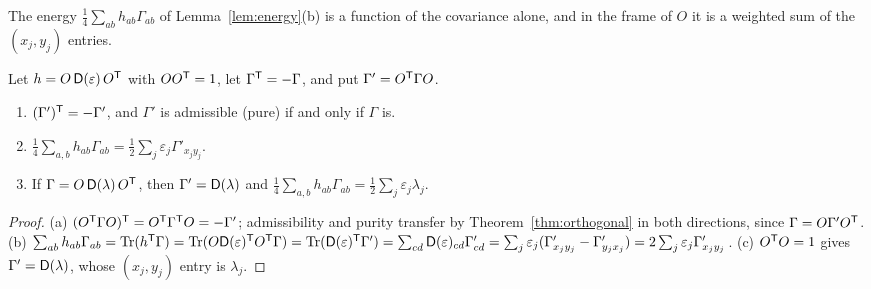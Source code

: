 The energy $\tfrac14\sum_{ab}h_{ab}\Gamma_{ab}$ of Lemma~\ref{lem:energy}(b) is a function of
the covariance alone, and in the frame of $O$ it is a weighted sum of the $(x_j,y_j)$ entries.
\begin{lemma}\label{lem:rotated-form}
Let $h=O\,\mathsf D(\varepsilon)\,O^{\mathsf T}$ with $OO^{\mathsf T}=1$, let $\Gamma^{\mathsf T}=-\Gamma$, and put
$\Gamma'=O^{\mathsf T}\Gamma O$.
\begin{enumerate}
\item[(a)] $(\Gamma')^{\mathsf T}=-\Gamma'$, and $\Gamma'$ is admissible (pure) if and only if $\Gamma$ is.
\item[(b)] $\tfrac14\sum_{a,b}h_{ab}\Gamma_{ab}=\tfrac12\sum_j\varepsilon_j\Gamma'_{x_jy_j}$.
\item[(c)] If $\Gamma=O\,\mathsf D(\lambda)\,O^{\mathsf T}$, then $\Gamma'=\mathsf D(\lambda)$ and
$\tfrac14\sum_{a,b}h_{ab}\Gamma_{ab}=\tfrac12\sum_j\varepsilon_j\lambda_j$.
\end{enumerate}
\end{lemma}
\begin{proof}
(a) $(O^{\mathsf T}\Gamma O)^{\mathsf T}=O^{\mathsf T}\Gamma^{\mathsf T}O=-\Gamma'$; admissibility and purity transfer
by Theorem~\ref{thm:orthogonal} in both directions, since $\Gamma=O\Gamma'O^{\mathsf T}$.
(b) $\sum_{ab}h_{ab}\Gamma_{ab}=\operatorname{Tr}(h^{\mathsf T}\Gamma)=\operatorname{Tr}(O\mathsf D(\varepsilon)^{\mathsf T}O^{\mathsf T}\Gamma)
=\operatorname{Tr}(\mathsf D(\varepsilon)^{\mathsf T}\Gamma')=\sum_{cd}\mathsf D(\varepsilon)_{cd}\Gamma'_{cd}
=\sum_j\varepsilon_j(\Gamma'_{x_jy_j}-\Gamma'_{y_jx_j})=2\sum_j\varepsilon_j\Gamma'_{x_jy_j}$.
(c) $O^{\mathsf T}O=1$ gives $\Gamma'=\mathsf D(\lambda)$, whose $(x_j,y_j)$ entry is $\lambda_j$.
\end{proof}

